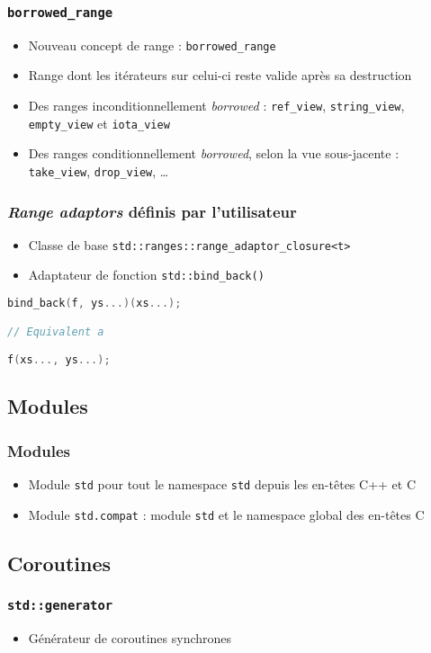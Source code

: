 \documentclass[C++.tex]{subfiles}
\begin{document}
\begin{frame}[fragile]
	\frametitle{\lstinline|borrowed_range|}
	\begin{itemize}
		\item Nouveau concept de range : \lstinline|borrowed_range|
		\item Range dont les itérateurs sur celui-ci reste valide après sa destruction
		\item Des ranges inconditionnellement \textit{borrowed} : \lstinline|ref_view|, \lstinline|string_view|, \lstinline|empty_view| et \lstinline|iota_view|
		\item Des ranges conditionnellement \textit{borrowed}, selon la vue sous-jacente : \lstinline|take_view|, \lstinline|drop_view|, \ldots
	\end{itemize}
\end{frame}

\begin{frame}[fragile]
	\frametitle{\textit{Range adaptors} définis par l'utilisateur}
	\begin{itemize}
		\item Classe de base \lstinline|std::ranges::range_adaptor_closure<t>|
		\item Adaptateur de fonction \lstinline|std::bind_back()|
	\end{itemize}

	\begin{lstlisting}[language=C++]
bind_back(f, ys...)(xs...);

// Equivalent a

f(xs..., ys...);\end{lstlisting}
\end{frame}

\subsection*{Modules}
\begin{frame}[fragile]
	\frametitle{Modules}
	\begin{itemize}
		\item Module \lstinline|std| pour tout le namespace \lstinline|std| depuis les en-têtes C++ et C
		\item Module \lstinline|std.compat| : module \lstinline|std| et le namespace global des en-têtes C
	\end{itemize}
\end{frame}

\subsection*{Coroutines}
\begin{frame}[fragile]
	\frametitle{\lstinline|std::generator|}
	\begin{itemize}
		\item Générateur de coroutines synchrones
	\end{itemize}
\end{frame}
\end{document}
